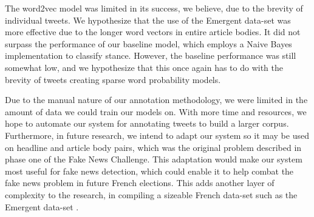 \documentclass[journal]{IEEEtran}
\begin{document}
The word2vec model was limited in its success, we believe, due to the brevity of individual tweets. We hypothesize that the use of the Emergent data-set \cite{ferreira_vlachos_2016} was more effective due to the longer word vectors in entire article bodies. It did not surpass the performance of our baseline model, which employs a Naive Bayes implementation to classify stance. However, the baseline performance was still somewhat low, and we hypothesize that this once again has to do with the brevity of tweets creating sparse word probability models.

Due to the manual nature of our annotation methodology, we were limited in the amount of data we could train our models on. With more time and resources, we hope to automate our system for annotating tweets to build a larger corpus. Furthermore, in future research, we intend to adapt our system so it may be used on headline and article body pairs, which was the original problem described in phase one of the Fake News Challenge. This adaptation would make our system most useful for fake news detection, which could enable it to help combat the fake news problem in future French elections. This adds another layer of complexity to the research, in compiling a sizeable French data-set such as the Emergent data-set \cite{ferreira_vlachos_2016}. 



\clearpage
\ifCLASSOPTIONcaptionsoff
  \newpage
\fi





\end{document}
